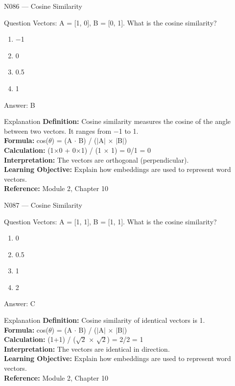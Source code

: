 \documentclass[aspectratio=169,8pt]{beamer}
\begin{document}
	\begin{frame}{N086 --- Cosine Similarity}
		\begin{block}{Question}
			Vectors: A = [1, 0], B = [0, 1]. What is the cosine similarity?
			\begin{enumerate}
				\item $-$1
				\item 0
				\item 0.5
				\item 1
			\end{enumerate}
		\end{block}
		\begin{exampleblock}{Answer: B}\end{exampleblock}
		\begin{block}{Explanation}
			\textbf{Definition:} Cosine similarity measures the cosine of the angle between two vectors. It ranges from $-$1 to 1.\\
			\textbf{Formula:} cos($\theta$) = (A $\cdot$ B) / ($|$A$|$ $\times$ $|$B$|$)\\
			\textbf{Calculation:} (1$\times$0 + 0$\times$1) / (1 $\times$ 1) = 0/1 = 0\\
			\textbf{Interpretation:} The vectors are orthogonal (perpendicular).\\
			\textbf{Learning Objective:} Explain how embeddings are used to represent word vectors.\\
			\textbf{Reference:} Module 2, Chapter 10
		\end{block}
	\end{frame}
	
	\begin{frame}{N087 --- Cosine Similarity}
		\begin{block}{Question}
			Vectors: A = [1, 1], B = [1, 1]. What is the cosine similarity?
			\begin{enumerate}
				\item 0
				\item 0.5
				\item 1
				\item 2
			\end{enumerate}
		\end{block}
		\begin{exampleblock}{Answer: C}\end{exampleblock}
		\begin{block}{Explanation}
			\textbf{Definition:} Cosine similarity of identical vectors is 1.\\
			\textbf{Formula:} cos($\theta$) = (A $\cdot$ B) / ($|$A$|$ $\times$ $|$B$|$)\\
			\textbf{Calculation:} (1+1) / ($\sqrt{2}$ $\times$ $\sqrt{2}$) = 2/2 = 1\\
			\textbf{Interpretation:} The vectors are identical in direction.\\
			\textbf{Learning Objective:} Explain how embeddings are used to represent word vectors.\\
			\textbf{Reference:} Module 2, Chapter 10
		\end{block}
	\end{frame}
	
\end{document}
